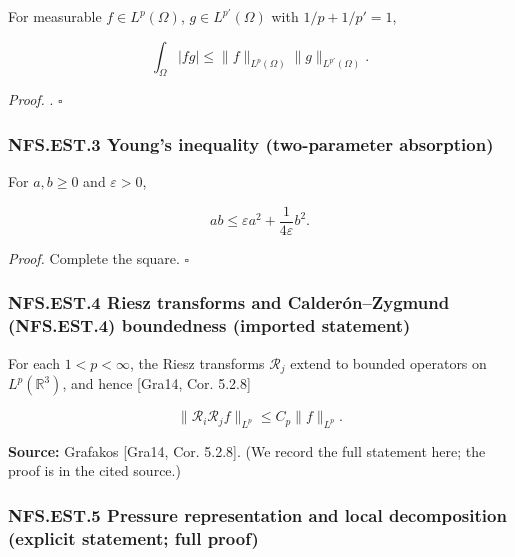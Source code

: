 \documentclass[
  11pt,
]{article}
\begin{document}
For measurable \(f\in L^p(\Omega)\), \(g\in L^{p'}(\Omega)\) with \(1/p+1/p'=1\),

\begin{equation}
\int_\Omega |fg|\le \|f\|_{L^p(\Omega)}\|g\|_{L^{p'}(\Omega)}.
\tag{EST2}\label{eq:EST2_holder}
\end{equation}

\emph{Proof.} . \(\square\)

\hypertarget{nfs.est.3-youngs-inequality-two-parameter-absorption}{%
\subsubsection{NFS.EST.3 Young's inequality (two-parameter absorption)}\label{nfs.est.3-youngs-inequality-two-parameter-absorption}}

For \(a,b\ge 0\) and \(\varepsilon>0\),

\begin{equation}
ab\le \varepsilon a^2+\frac1{4\varepsilon}b^2.
\tag{EST3}\label{eq:EST3_young}
\end{equation}

\emph{Proof.} Complete the square. \(\square\)

\hypertarget{nfs.est.4-riesz-transforms-and-calderuxf3nzygmund-nfs.est.4-boundedness-imported-statement}{%
\subsubsection{NFS.EST.4 Riesz transforms and Calderón--Zygmund (NFS.EST.4) boundedness (imported statement)}\label{nfs.est.4-riesz-transforms-and-calderuxf3nzygmund-nfs.est.4-boundedness-imported-statement}}

For each \(1<p<\infty\), the Riesz transforms \(\mathcal R_j\) extend to bounded operators on \(L^p(\mathbb R^3)\), and hence {[}Gra14, Cor. 5.2.8{]}

\begin{equation}
\|\mathcal R_i\mathcal R_j f\|_{L^p}\le C_p \|f\|_{L^p}.
\tag{EST4}\label{eq:EST4_RieszLp}
\end{equation}

\textbf{Source:} Grafakos {[}Gra14, Cor. 5.2.8{]}. (We record the full statement here; the proof is in the cited source.)

\hypertarget{nfs.est.5-pressure-representation-and-local-decomposition-explicit-statement-full-proof}{%
\subsubsection{NFS.EST.5 Pressure representation and local decomposition (explicit statement; full proof)}\label{nfs.est.5-pressure-representation-and-local-decomposition-explicit-statement-full-proof}}
\end{document}
